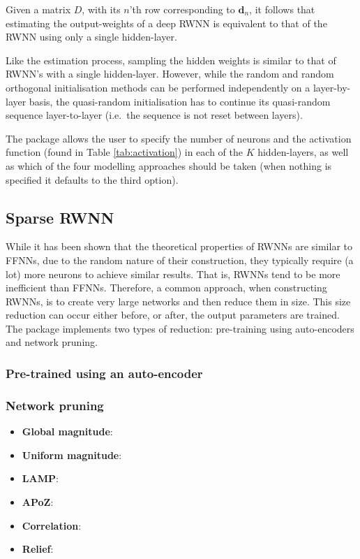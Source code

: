 \documentclass[
]{jss}
\providecommand{\tightlist}{%
  \setlength{\itemsep}{0pt}\setlength{\parskip}{0pt}}
\begin{document}
Given a matrix \(D\), with its \(n\)'th row corresponding to
\(\boldsymbol{d}_n\), it follows that estimating the output-weights of a
deep RWNN is equivalent to that of the RWNN using only a single
hidden-layer.

Like the estimation process, sampling the hidden weights is similar to
that of RWNN's with a single hidden-layer. However, while the random and
random orthogonal initialisation methods can be performed independently
on a layer-by-layer basis, the quasi-random initialisation has to
continue its quasi-random sequence layer-to-layer (i.e.~the sequence is
not reset between layers).

The  package allows the user to specify the number of neurons
and the activation function (found in Table \ref{tab:activation}) in
each of the \(K\) hidden-layers, as well as which of the four modelling
approaches should be taken (when nothing is specified it defaults to the
third option).

\hypertarget{sparse-rwnn}{%
\subsection{Sparse RWNN}\label{sparse-rwnn}}

While it has been shown that the theoretical properties of RWNNs are
similar to FFNNs, due to the random nature of their construction, they
typically require (a lot) more neurons to achieve similar results. That
is, RWNNs tend to be more inefficient than FFNNs. Therefore, a common
approach, when constructing RWNNs, is to create very large networks and
then reduce them in size. This size reduction can occur either before,
or after, the output parameters are trained. The  package
implements two types of reduction: pre-training using auto-encoders and
network pruning.

\hypertarget{pre-trained-using-an-auto-encoder}{%
\subsubsection{Pre-trained using an
auto-encoder}\label{pre-trained-using-an-auto-encoder}}

\hypertarget{network-pruning}{%
\subsubsection{Network pruning}\label{network-pruning}}

\begin{itemize}
\tightlist
\item
  \textbf{Global magnitude}:
\item
  \textbf{Uniform magnitude}:
\item
  \textbf{LAMP}:
\item
  \textbf{APoZ}:
\item
  \textbf{Correlation}:
\item
  \textbf{Relief}:
\end{itemize}
\end{document}
